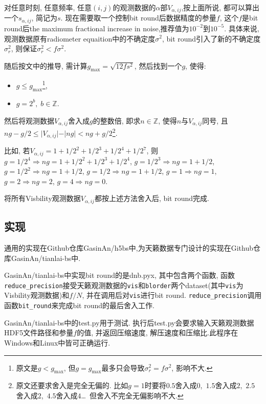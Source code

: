 \documentclass[12pt]{ctexart}
\def\v{\verb}
\begin{document}
对任意时刻, 任意频率, 任意$(i,j)$的观测数据的$\alpha$部$V_{\alpha,ij}$,按上面所说, 都可以算出一个$s_{\alpha,ij}$, 简记为$s$. 现在需要取一个控制bit round后数据精度的参量$f$, 这个$f$是bit round后the maximum fractional increase in noise,推荐值为$10^{-2}$到$10^{-5}$. 具体来说, 观测数据原有radiometer equaition中的不确定度$\sigma^2$, bit round引入了新的不确定度$\sigma_r^2$, 则保证$\sigma_r^2<f \sigma^2$.

随后按文中的推导, 需计算$g_{\text{max}}=\sqrt{12fs^2}$, 然后找到一个$g$, 使得:
\begin{itemize}
    \item $g \le g_{\text{max}}$\footnote{
        原文是$g < g_{\text{max}}$, 但$g = g_{\text{max}}$最多只会导致$\sigma_r^2=f \sigma^2$, 影响不大.},
    \item $g = 2^{b},\; b \in \mathbb{Z} $.
\end{itemize}

然后将观测数据$V_{\alpha,ij}$舍入成$g$的整数倍, 即求$n \in \mathbb{Z}$, 使得$n$与$V_{\alpha,ij}$同号, 且$ng-g/2\le\vert V_{\alpha,ij}\vert-\vert ng \vert< ng+g/2 $\footnote{
    原文还要求舍入是完全无偏的. 比如$g=1$时要将$0.5$舍入成$0$,~$1.5$舍入成$2$,~$2.5$舍入成$2$,~$4.5$舍入成$4$\dots~但舍入不完全无偏影响不大.
}.

比如, 若$V_{\alpha,ij}=1+1/2^2+1/2^3+1/2^4+1/2^7$, 则$g=1/2^4 \Rightarrow ng=1+1/2^2+1/2^3+1/2^4$, $g=1/2^3 \Rightarrow ng=1+1/2$, $g=1/2^2 \Rightarrow ng=1+1/2$, $g=1/2 \Rightarrow ng=1+1/2$, $g=1 \Rightarrow ng=1$, $g=2 \Rightarrow ng=2$, $g=4 \Rightarrow ng=0$.

将所有Visbility观测数据$V_{\alpha,ij}$都按上述方法舍入后, bit round完成.

\subsection{实现}

通用的实现在Github仓库GasinAn/h5bs中,为天籁数据专门设计的实现在Github仓库GasinAn/tianlai-bs中.

GasinAn/tianlai-bs中实现bit round的是dnb.pyx, 其中包含两个函数, 函数\v|reduce_precision|接受天籁观测数据的\v|vis|和\v|blorder|两个dataset(其中\v|vis|为Visbility观测数据)和$f/N$, 并在调用后对\v|vis|进行bit round. \v|reduce_precision|调用函数\v|bit_round|来完成bit round的最后舍入工作.

GasinAn/tianlai-bs中的test.py用于测试. 执行后test.py会要求输入天籁观测数据HDF5文件路径和参量$f$的值, 并返回压缩速度, 解压速度和压缩比.此程序在Windows和Linux中皆可正确运行.
\end{document}
